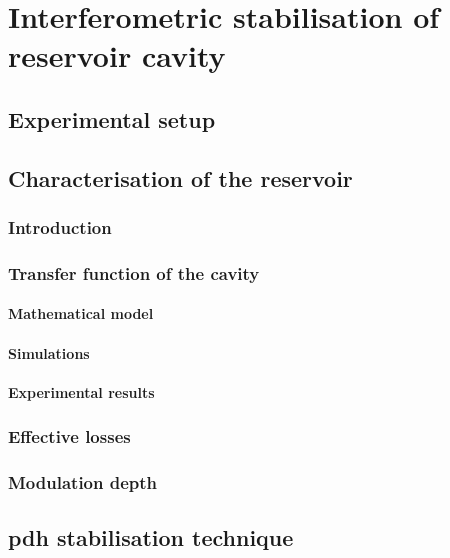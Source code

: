 \chapter{Interferometric stabilisation of reservoir cavity}

\section{Experimental setup}

\section{Characterisation of the reservoir}

\subsection{Introduction}

\subsection{Transfer function of the cavity}

\subsubsection{Mathematical model}

\subsubsection{Simulations}

\subsubsection{Experimental results}

\subsection{Effective losses}

\subsection{Modulation depth}

\section{\acrlong{pdh} stabilisation technique}

